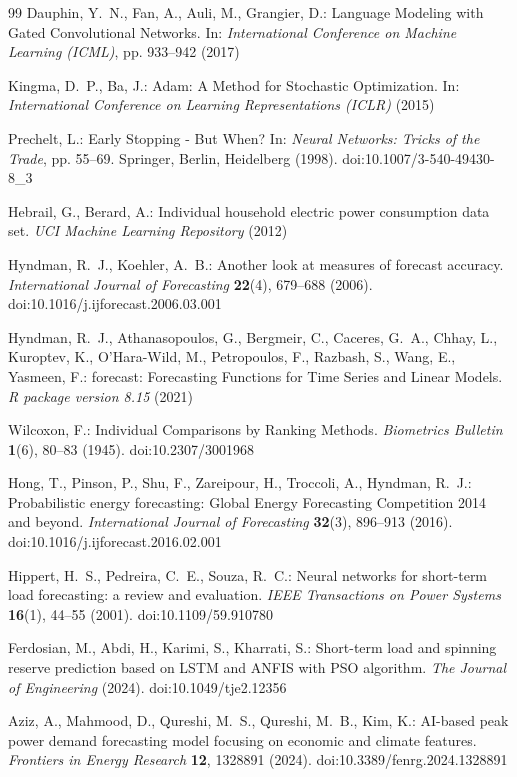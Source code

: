\documentclass[pdflatex,sn-mathphys-num]{sn-jnl}
\theoremstyle{thmstyleone}
\theoremstyle{thmstyletwo}
\theoremstyle{thmstylethree}
\begin{document}
\begin{thebibliography}{99}
Dauphin, Y.~N., Fan, A., Auli, M., Grangier, D.: Language Modeling with Gated Convolutional Networks. In: \textit{International Conference on Machine Learning (ICML)}, pp. 933--942 (2017)

Kingma, D.~P., Ba, J.: Adam: A Method for Stochastic Optimization. In: \textit{International Conference on Learning Representations (ICLR)} (2015)

Prechelt, L.: Early Stopping - But When? In: \textit{Neural Networks: Tricks of the Trade}, pp. 55--69. Springer, Berlin, Heidelberg (1998). doi:10.1007/3-540-49430-8\_3

Hebrail, G., Berard, A.: Individual household electric power consumption data set. \textit{UCI Machine Learning Repository} (2012)

Hyndman, R.~J., Koehler, A.~B.: Another look at measures of forecast accuracy. \textit{International Journal of Forecasting} \textbf{22}(4), 679--688 (2006). doi:10.1016/j.ijforecast.2006.03.001

Hyndman, R.~J., Athanasopoulos, G., Bergmeir, C., Caceres, G.~A., Chhay, L., Kuroptev, K., O'Hara-Wild, M., Petropoulos, F., Razbash, S., Wang, E., Yasmeen, F.: forecast: Forecasting Functions for Time Series and Linear Models. \textit{R package version 8.15} (2021)

Wilcoxon, F.: Individual Comparisons by Ranking Methods. \textit{Biometrics Bulletin} \textbf{1}(6), 80--83 (1945). doi:10.2307/3001968

Hong, T., Pinson, P., Shu, F., Zareipour, H., Troccoli, A., Hyndman, R.~J.: Probabilistic energy forecasting: Global Energy Forecasting Competition 2014 and beyond. \textit{International Journal of Forecasting} \textbf{32}(3), 896--913 (2016). doi:10.1016/j.ijforecast.2016.02.001

Hippert, H.~S., Pedreira, C.~E., Souza, R.~C.: Neural networks for short-term load forecasting: a review and evaluation. \textit{IEEE Transactions on Power Systems} \textbf{16}(1), 44--55 (2001). doi:10.1109/59.910780

Ferdosian, M., Abdi, H., Karimi, S., Kharrati, S.: Short-term load and spinning reserve prediction based on LSTM and ANFIS with PSO algorithm. \textit{The Journal of Engineering} (2024). doi:10.1049/tje2.12356

Aziz, A., Mahmood, D., Qureshi, M.~S., Qureshi, M.~B., Kim, K.: AI-based peak power demand forecasting model focusing on economic and climate features. \textit{Frontiers in Energy Research} \textbf{12}, 1328891 (2024). doi:10.3389/fenrg.2024.1328891
\end{thebibliography}
\end{document}
